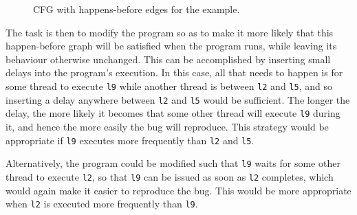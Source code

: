 \begin{figure}
  \caption{CFG with happens-before edges for the example.}
  \label{fig:using:example_hb_graph}
\end{figure}

The task is then to modify the program so as to make it more likely
that this happen-before graph will be satisfied when the program runs,
while leaving its behaviour otherwise unchanged.  This can be
accomplished by inserting small delays into the program's execution.
In this case, all that needs to happen is for some thread to execute
\texttt{l9} while another thread is between \texttt{l2} and
\texttt{l5}, and so inserting a delay anywhere between \texttt{l2} and
\texttt{l5} would be sufficient.  The longer the delay, the more
likely it becomes that some other thread will execute \texttt{l9}
during it, and hence the more easily the bug will reproduce.  This
strategy would be appropriate if \texttt{l9} executes more frequently
than \texttt{l2} and \texttt{l5}.

Alternatively, the program could be modified such that \texttt{l9}
waits for some other thread to execute \texttt{l2}, so that
\texttt{l9} can be issued as soon as \texttt{l2} completes, which
would again make it easier to reproduce the bug.  This would be more
appropriate when \texttt{l2} is executed more frequently than
\texttt{l9}.

